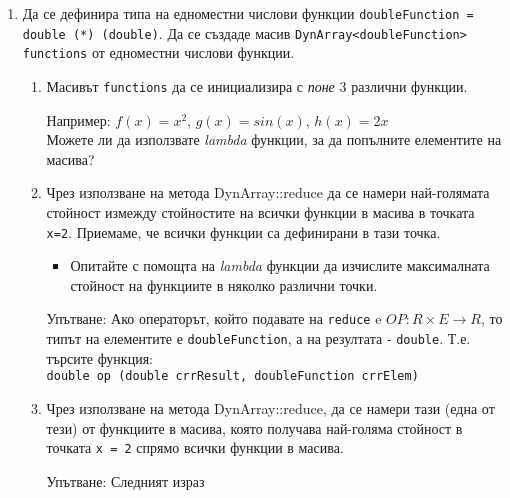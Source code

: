 \documentclass[12pt,a4paper]{article}
\begin{document}
\begin{enumerate}
\begin{enumerate}
		\end{enumerate}

	\item Да се дефинира типа на едноместни числови функции \texttt{doubleFunction = double (*) (double)}. Да се създаде масив \texttt{DynArray<doubleFunction> functions} от едноместни числови функции.

	\begin{enumerate}
		\item Масивът \texttt{functions} да се инициализира с \textit{поне} 3 различни функции.
		\begin{mdframed}[hidealllines=true,backgroundcolor=gray!20]
		Например: $f(x)=x^2$, $g(x)=sin(x)$, $h(x) = 2x$\\

		Можете ли да използвате \textit{lambda} функции, за да попълните елементите на масива?
		\end{mdframed}

		\item Чрез използване на метода DynArray::reduce да се намери най-голямата стойност измежду стойностите на всички функции в масива в точката \texttt{x=2}. Приемаме, че всички функции са дефинирани в тази точка.
			\begin{itemize}
				\item Опитайте с помощта на \textit{lambda} функции да изчислите максималната стойност на функциите в няколко различни точки.
			\end{itemize}
		\begin{mdframed}[hidealllines=true,backgroundcolor=gray!20]
				Упътване: Ако операторът, който подавате на \texttt{reduce}  e $OP: R \times E \rightarrow R$, то типът на елементите е \texttt{doubleFunction}, а на резултата - \texttt{double}. Т.е. търсите функция:\\

				\texttt{double op (double crrResult, doubleFunction crrElem)}
		\end{mdframed}

		\item Чрез използване на метода DynArray::reduce, да се намери тази (една от тези) от функциите в масива, която получава най-голяма стойност в точката \texttt{x = 2} спрямо всички функции в масива.

		\begin{mdframed}[hidealllines=true,backgroundcolor=gray!20]
				Упътване: Следният израз\\


\end{mdframed}
\end{enumerate}
\end{enumerate}
\end{document}
